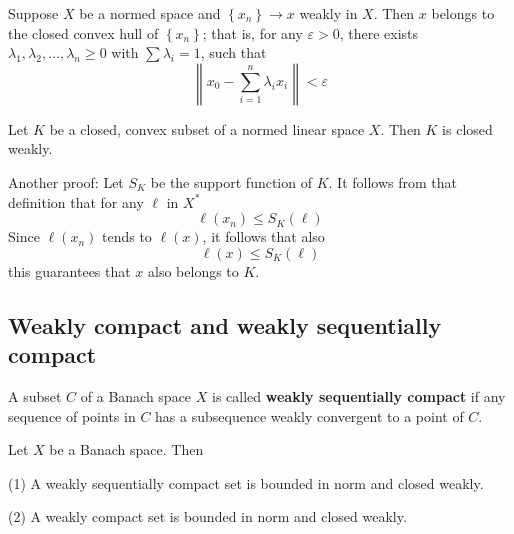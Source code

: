 \documentclass[12pt, oneside]{book}
\begin{document}
\begin{theorem}[Mazur]
    Suppose $X$ be a normed space and $\left\{x_n\right\} \to x$ weakly in $X$.
    Then $x$ belongs to the closed convex hull of $\left\{x_n\right\}$;
    that is, for any $\varepsilon > 0$, there exists $\lambda_1,\lambda_2,\ldots ,\lambda_n \geq 0$ with $\sum \lambda_i=1$, such that
    \begin{equation*}
        \left\|x_0-\sum_{i=1}^n \lambda_i x_i\right\| < \varepsilon
    \end{equation*}
\end{theorem}

\begin{corollary}[Mazur]
    Let $K$ be a closed, convex subset of a normed linear space $X$. Then $K$ is closed weakly.

    Another proof:
    Let $S_K$ be the support function of $K$. It follows from that definition that for any $\ell$ in $X^*$
    \begin{equation*}
        \ell\left(x_n\right) \leq S_K(\ell)
    \end{equation*}
    Since $\ell\left(x_n\right)$ tends to $\ell(x)$, it follows that also
    \begin{equation*}
        \ell(x) \leq S_K(\ell)
    \end{equation*}
    this guarantees that $x$ also belongs to $K$.
\end{corollary}





\subsection{Weakly compact and weakly sequentially compact}


\begin{definition}
    A subset $C$ of a Banach space $X$ is called \textbf{weakly sequentially compact} if any sequence of points in $C$ has a subsequence weakly convergent to a point of $C$.
\end{definition}

\begin{proposition}
    Let $X$ be a Banach space. Then

    (1) A weakly sequentially compact set is bounded in norm and closed weakly.

    (2) A weakly compact set is bounded in norm and closed weakly.
\end{proposition}
\end{document}
